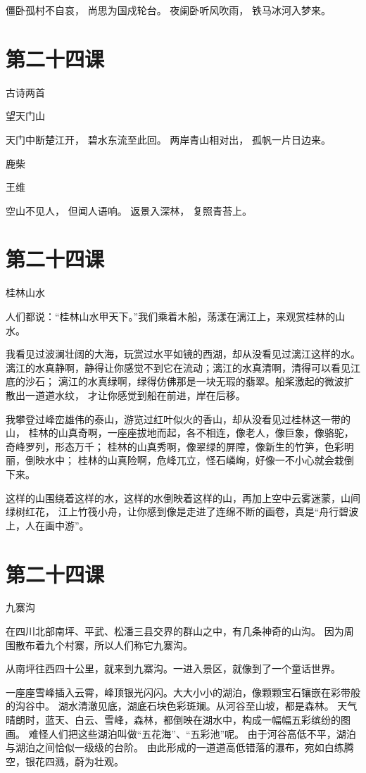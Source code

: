 \documentclass[12pt,UTF8]{ctexbook}
\begin{document}
僵卧孤村不自哀，
尚思为国戍轮台。
夜阑卧听风吹雨，
铁马冰河入梦来。

\section{第二十四课}

古诗两首

望天门山

天门中断楚江开，
碧水东流至此回。
两岸青山相对出，
孤帆一片日边来。

鹿柴

王维

空山不见人，
但闻人语响。
返景入深林，
复照青苔上。

\section{第二十四课}

桂林山水

人们都说：“桂林山水甲天下。”我们乘着木船，荡漾在漓江上，来观赏桂林的山水。

我看见过波澜壮阔的大海，玩赏过水平如镜的西湖，却从没看见过漓江这样的水。
漓江的水真静啊，静得让你感觉不到它在流动；漓江的水真清啊，清得可以看见江底的沙石；
漓江的水真绿啊，绿得仿佛那是一块无瑕的翡翠。船桨激起的微波扩散出一道道水纹，
才让你感觉到船在前进，岸在后移。

我攀登过峰峦雄伟的泰山，游览过红叶似火的香山，却从没看见过桂林这一带的山，
桂林的山真奇啊，一座座拔地而起，各不相连，像老人，像巨象，像骆驼，奇峰罗列，形态万千；
桂林的山真秀啊，像翠绿的屏障，像新生的竹笋，色彩明丽，倒映水中；
桂林的山真险啊，危峰兀立，怪石嶙峋，好像一不小心就会栽倒下来。

这样的山围绕着这样的水，这样的水倒映着这样的山，再加上空中云雾迷蒙，山间绿树红花，
江上竹筏小舟，让你感到像是走进了连绵不断的画卷，真是“舟行碧波上，人在画中游”。

\section{第二十四课}

九寨沟

在四川北部南坪、平武、松潘三县交界的群山之中，有几条神奇的山沟。
因为周围散布着九个村寨，所以人们称它九寨沟。

从南坪往西四十公里，就来到九寨沟。一进入景区，就像到了一个童话世界。

一座座雪峰插入云霄，峰顶银光闪闪。大大小小的湖泊，像颗颗宝石镶嵌在彩带般的沟谷中。
湖水清澈见底，湖底石块色彩斑斓。从河谷至山坡，都是森林。
天气晴朗时，蓝天、白云、雪峰，森林，都倒映在湖水中，构成一幅幅五彩缤纷的图画。
难怪人们把这些湖泊叫做“五花海”、“五彩池”呢。
由于河谷高低不平，湖泊与湖泊之间恰似一级级的台阶。
由此形成的一道道高低错落的瀑布，宛如白练腾空，银花四溅，蔚为壮观。
\end{document}
